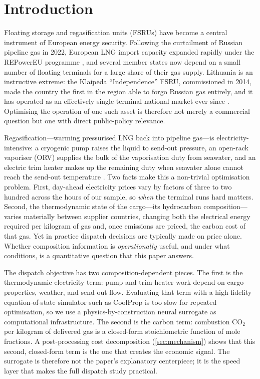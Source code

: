 \documentclass[11pt]{article}
\begin{document}
\section{Introduction}
\label{sec:intro}

Floating storage and regasification units (FSRUs) have become a central
instrument of European energy security. Following the curtailment of
Russian pipeline gas in 2022, European LNG import capacity expanded rapidly
under the REPowerEU programme \citep{eu2022crisis,acer2024lng}, and several member
states now depend on a small number of floating terminals for a large share
of their gas supply. Lithuania is an instructive extreme: the Klaip\.eda
``Independence'' FSRU, commissioned in 2014, made the country the first in
the region able to forgo Russian gas entirely, and it has operated as an
effectively single-terminal national market ever since
\citep{iea2021lithuania,iea2021lithuania_gas_security,lithuania2022russian_gas}. Optimising the operation of one such asset is
therefore not merely a commercial question but one with direct public-policy
relevance.

Regasification---warming pressurised LNG back into pipeline gas---is
electricity-intensive: a cryogenic pump raises the liquid to send-out
pressure, an open-rack vaporiser (ORV) supplies the bulk of the
vaporisation duty from seawater, and an electric trim heater makes up the
remaining duty when seawater alone cannot reach the send-out temperature
\citep{lim2013lng,he2017lng_regas_geography,kanbur2017lng_cold_review}. Two facts make this a non-trivial optimisation problem.
First, day-ahead electricity prices vary by factors of three to two hundred
across the hours of our sample, so \emph{when} the terminal runs hard
matters. Second, the thermodynamic state of the cargo---its hydrocarbon
composition---varies materially between supplier countries, changing both
the electrical energy required per kilogram of gas and, once emissions are
priced, the carbon cost of that gas. Yet in practice dispatch decisions are
typically made on price alone. Whether composition information is
\emph{operationally} useful, and under what conditions, is a quantitative
question that this paper answers.

The dispatch objective has two composition-dependent pieces. The first is the
thermodynamic electricity term: pump and trim-heater work depend on cargo
properties, weather, and send-out flow. Evaluating that term with a
high-fidelity equation-of-state simulator such as CoolProp
\citep{bell2014pure,huber2022refprop} is too slow for repeated optimisation, so
we use a physics-by-construction neural surrogate as computational
infrastructure. The second is the carbon term: combustion CO$_2$ per kilogram
of delivered gas is a closed-form stoichiometric function of mole fractions.
A post-processing cost decomposition (\cref{sec:mechanism}) shows that this
second, closed-form term is the one that creates the economic signal. The
surrogate is therefore not the paper's explanatory centerpiece; it is the speed
layer that makes the full dispatch study practical.
\end{document}
